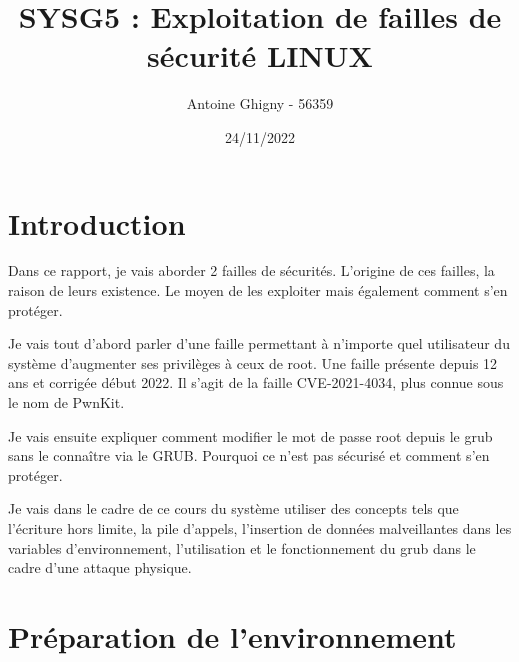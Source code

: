 \documentclass[12pt,a4paper]{article}
\title{SYSG5 : Exploitation de failles de sécurité LINUX}
\author{Antoine Ghigny - 56359}          \let\Author\@author
\date{24/11/2022}           \let\Date\@date
\begin{document}
\maketitle 
   \newpage
   \tableofcontents
   \section{Introduction}
   \begin{flushleft}
       \noindent Dans ce rapport, je vais aborder 2 failles de sécurités. L'origine de ces failles, la raison de leurs existence. Le moyen de les exploiter mais également comment s'en protéger.
       \item Je vais tout d'abord parler d'une faille permettant à n'importe quel utilisateur du système d'augmenter ses privilèges à ceux de root. Une faille présente depuis 12 ans et corrigée début 2022. Il s'agit de la faille CVE-2021-4034, plus connue sous le nom de PwnKit.
       \item Je vais ensuite expliquer comment modifier le mot de passe root depuis le grub sans le connaître via le GRUB. Pourquoi ce n'est pas sécurisé et comment s'en protéger. 
       \item Je vais dans le cadre de ce cours du système utiliser des concepts tels que l'écriture hors limite, la pile d'appels, l'insertion de données malveillantes dans les variables d'environnement, l'utilisation et le fonctionnement du grub dans le cadre d'une attaque physique.
   \end{flushleft}

   \section{Préparation de l'environnement}
\end{document}
